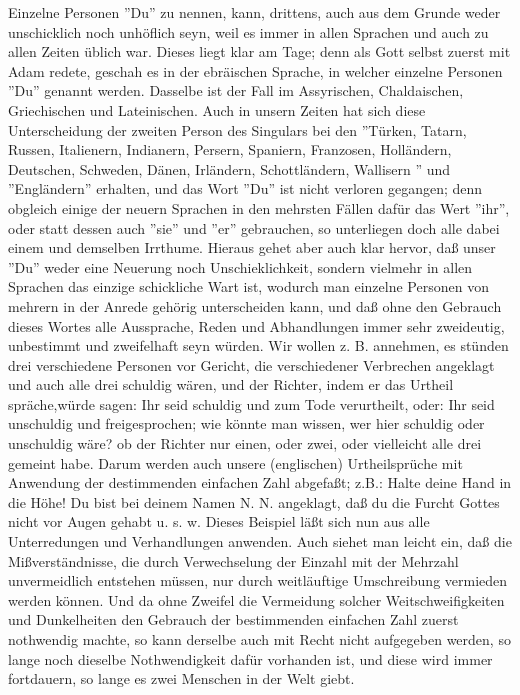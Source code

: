 Einzelne Personen ''Du'' zu nennen, kann, drittens, auch aus dem Grunde weder
unschicklich noch unhöflich seyn, weil es immer in allen Sprachen und auch zu
allen Zeiten üblich war. Dieses liegt klar am Tage; denn als Gott selbst zuerst
mit Adam redete, geschah es in der ebräischen Sprache, in welcher einzelne
Personen ''Du'' genannt werden. Dasselbe ist der Fall im Assyrischen,
Chaldaischen, Griechischen und Lateinischen. Auch in unsern Zeiten hat sich
diese Unterscheidung der zweiten Person des Singulars bei den ''Türken, Tatarn,
Russen, Italienern, Indianern, Persern, Spaniern, Franzosen, Holländern,
Deutschen, Schweden, Dänen, Irländern, Schottländern, Wallisern
'' und ''Engländern'' erhalten, und das Wort ''Du'' ist nicht verloren gegangen;
denn obgleich einige der neuern Sprachen in den mehrsten Fällen dafür das Wert
''ihr'', oder statt dessen auch ''sie'' und ''er'' gebrauchen, so unterliegen
doch alle dabei einem und demselben Irrthume. Hieraus gehet aber auch klar
hervor, daß unser ''Du'' weder eine Neuerung noch Unschieklichkeit, sondern
vielmehr in allen Sprachen das einzige schickliche Wart ist, wodurch man
einzelne Personen von mehrern in der Anrede gehörig unterscheiden kann, und daß
ohne den Gebrauch dieses Wortes alle Aussprache, Reden und Abhandlungen immer
sehr zweideutig, unbestimmt und zweifelhaft seyn würden. Wir wollen z. B.
annehmen, es stünden drei verschiedene Personen vor Gericht, die verschiedener
Verbrechen angeklagt und auch alle drei schuldig wären, und der Richter, indem
er das Urtheil spräche,würde sagen: Ihr seid schuldig und zum Tode verurtheilt,
oder: Ihr seid unschuldig und freigesprochen; wie könnte man wissen, wer hier
schuldig oder unschuldig wäre? ob der Richter nur einen, oder zwei, oder
vielleicht alle drei gemeint habe. Darum werden auch unsere (englischen)
Urtheilsprüche mit Anwendung der destimmenden einfachen Zahl abgefaßt; z.B.:
Halte deine Hand in die Höhe! Du bist bei deinem Namen N. N. angeklagt, daß du
die Furcht Gottes nicht vor Augen gehabt u. s. w. Dieses Beispiel läßt sich nun
aus alle Unterredungen und Verhandlungen anwenden. Auch siehet man leicht ein,
daß die Mißverständnisse, die durch Verwechselung der Einzahl mit der Mehrzahl
unvermeidlich entstehen müssen, nur durch weitläuftige Umschreibung vermieden
werden können. Und da ohne Zweifel die Vermeidung solcher Weitschweifigkeiten
und Dunkelheiten den Gebrauch der bestimmenden einfachen Zahl zuerst nothwendig
machte, so kann derselbe auch mit Recht nicht aufgegeben werden, so lange noch
dieselbe Nothwendigkeit dafür vorhanden ist, und diese wird immer fortdauern, so
lange es zwei Menschen in der Welt giebt.

